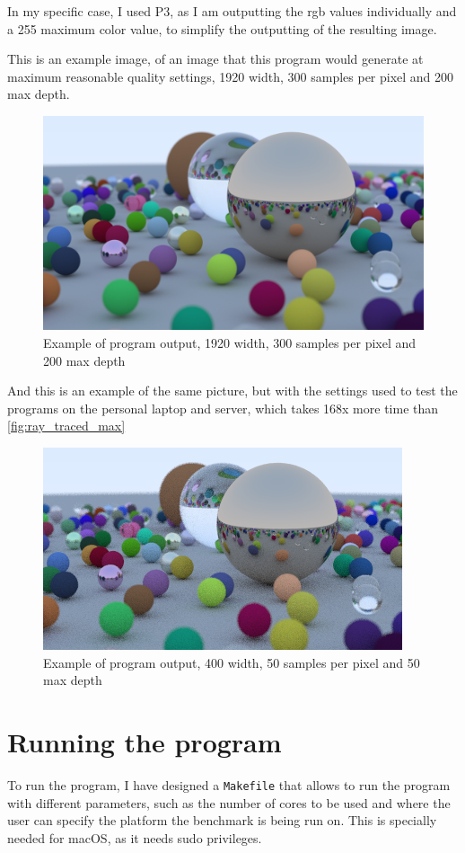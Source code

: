 In my specific case, I used P3, as I am outputting the \gls{rgb} values individually and a 255 maximum color value, to simplify the outputting of the resulting image.

This is an example image, of an image that this program would generate at maximum reasonable quality settings, 1920 width, 300 samples per pixel and 200 max depth.

\begin{figure}[h]
    \centering
    \includegraphics[width=0.65\linewidth]{img/ray_traced_balls.png}
    \caption[Sample program output high-resolution]{Example of program output, 1920 width, 300 samples per pixel and 200 max depth}
    \label{fig:ray_traced_max}
\end{figure}

And this is an example of the same picture, but with the settings used to test the programs on the personal laptop and server, which takes 168x more time than \autoref{fig:ray_traced_max}

\begin{figure}[h]
    \centering
    \includegraphics[width=0.65\linewidth]{img/regular_spheres_output.png}
    \caption[Sample program output default configuration]{Example of program output, 400 width, 50 samples per pixel and 50 max depth}
    \label{fig:ray_traced_average}
\end{figure}

\section{Running the program}
\label{sec:running_program}
To run the program, I have designed a \texttt{Makefile} that allows to run the program with different parameters, such as the number of cores to be used and where the user can specify the platform the benchmark is being run on. This is specially needed for macOS, as it needs \gls{sudo} privileges.

